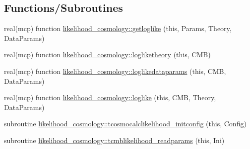 \subsection*{Functions/\+Subroutines}
\begin{DoxyCompactItemize}
\item 
real(mcp) function \mbox{\hyperlink{namespacelikelihood__cosmology_a28ab9c3076608cb7b1550060aa9b450b}{likelihood\+\_\+cosmology\+::getloglike}} (this, Params, Theory, Data\+Params)
\item 
real(mcp) function \mbox{\hyperlink{namespacelikelihood__cosmology_adfac1b06d8d335f24e427fe3629f706c}{likelihood\+\_\+cosmology\+::logliketheory}} (this, C\+MB)
\item 
real(mcp) function \mbox{\hyperlink{namespacelikelihood__cosmology_a1b2ee95e5e883485f7ba0635f9a5beef}{likelihood\+\_\+cosmology\+::loglikedataparams}} (this, C\+MB, Data\+Params)
\item 
real(mcp) function \mbox{\hyperlink{namespacelikelihood__cosmology_ad4c3f93cdd27d0b291676092a4e2023b}{likelihood\+\_\+cosmology\+::loglike}} (this, C\+MB, Theory, Data\+Params)
\item 
subroutine \mbox{\hyperlink{namespacelikelihood__cosmology_a75b0a523a1d5bbf9d32e34de5153ef36}{likelihood\+\_\+cosmology\+::tcosmocalclikelihood\+\_\+initconfig}} (this, Config)
\item 
subroutine \mbox{\hyperlink{namespacelikelihood__cosmology_a75d41b40f363669474961a1660570174}{likelihood\+\_\+cosmology\+::tcmblikelihood\+\_\+readparams}} (this, Ini)
\end{DoxyCompactItemize}
